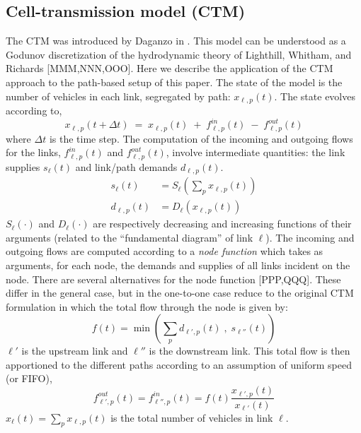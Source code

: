\subsection{Cell-transmission model (CTM)}
The CTM was introduced by Daganzo in \cite{daganzo1995cell}. This model can be understood as a Godunov discretization of the hydrodynamic theory of Lighthill, Whitham, and Richards [MMM,NNN,OOO]. Here we describe the application of the CTM approach to the path-based setup of this paper. The state of the model is the number of vehicles in each link, segregated by path: $x_{\ell,p}(t)$. The state evolves according to,
\begin{equation}
x_{\ell,p}(t+\Delta t) \;=\; x_{\ell,p}(t) \;+\; f^{in}_{\ell,p}(t) \;-\; f^{out}_{\ell,p}(t)
\end{equation}
where $\Delta t$ is the time step. The computation of the incoming and outgoing flows for the links, $f^{in}_{\ell,p}(t)$ and $f^{out}_{\ell,p}(t)$, involve intermediate quantities: the link supplies $s_\ell(t)$ and link/path demands $d_{\ell,p}(t)$.
\begin{align}
s_\ell(t) &= S_\ell\left(\sum_{p} x_{\ell,p}(t)\right) \\
d_{\ell,p}(t) &= D_\ell(x_{\ell,p}(t))
\end{align}
$S_\ell(\cdot)$ and $D_\ell(\cdot)$ are respectively decreasing and increasing functions of their arguments (related to the ``fundamental diagram'' of link $\ell$). The incoming and outgoing flows are computed according to a \textit{node function} which takes as arguments, for each node, the demands and supplies of all links incident on the node. There are several alternatives for the node function [PPP,QQQ]. These differ in the general case, but in the one-to-one case reduce to the original CTM formulation in which the total flow through the node is given by:
\begin{equation}
\label{eq:f}
f(t) = \min\left( \sum_{p}d_{\ell',p}(t) \; , \; s_{\ell''}(t)  \right)
\end{equation}
$\ell'$ is the upstream link and $\ell''$ is the downstream link. This total flow is then apportioned to the different paths according to an assumption of uniform speed (or FIFO),
\begin{equation}
f^{out}_{\ell',p}(t) = f^{in}_{\ell'',p}(t) = f(t)\frac{x_{\ell',p}(t)}{x_{\ell'}(t)}
\end{equation}
$x_{\ell}(t) = \sum_{p} x_{\ell,p}(t)$ is the total number of vehicles in link $\ell$.

